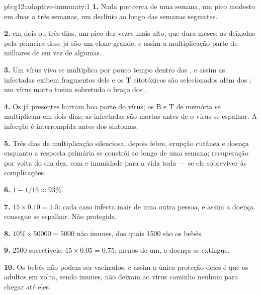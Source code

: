 \begin{solution}{pb:g12:adaptive-immunity:1}
\textbf{1.} Nada por cerca de uma semana, um pico modesto em duas a
três semanas, um declínio ao longo das semanas seguintes.

\textbf{2.}  em dois ou três dias, um pico dez vezes mais
alto, que dura meses: as  deixadas pela primeira dose
já são um clone grande, e assim a multiplicação parte de milhares de
 em vez de algumas.

\textbf{3.} Um vírus vivo se multiplica por pouco tempo dentro das
, e assim as  infectadas exibem fragmentos dele e os
 T citotóxicos são selecionados além dos ; um vírus
morto treina sobretudo o braço dos .

\textbf{4.} Os  já presentes barram boa parte do vírus; os
 B e T de memória se multiplicam em dois dias; as 
infectadas são mortas antes de o vírus se espalhar. A infecção é
interrompida antes dos sintomas.

\textbf{5.} Três dias de multiplicação silenciosa, depois febre,
erupção cutânea e doença enquanto a resposta primária se constrói ao
longo de uma semana; recuperação por volta do dia dez, com  e imunidade para a vida toda --- se ele sobreviver às complicações.

\textbf{6.} $1 - 1/15 \approx 93\%$.

\textbf{7.} $15 \times 0.10 = 1.5$: cada caso infecta mais de uma outra
pessoa, e assim a doença consegue se espalhar. Não protegida.

\textbf{8.} $10\% \times \num{50000} = 5000$ não imunes, dos quais 1500
são os bebês.

\textbf{9.} 2500 suscetíveis; $15 \times 0.05 = 0.75$: menos de um, a
doença se extingue.

\textbf{10.} Os bebês não podem ser vacinados, e assim a única proteção
deles é que os adultos em volta, sendo imunes, não deixam ao vírus
caminho nenhum para chegar até eles.


\end{solution}
